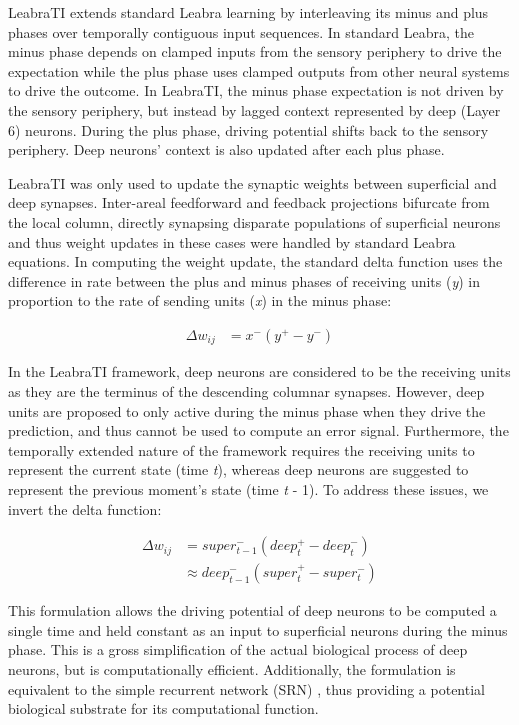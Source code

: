 \documentclass[dwyatte_dissertation.tex]{subfiles}
\begin{document}
LeabraTI extends standard Leabra learning by interleaving its minus and plus phases over temporally contiguous input sequences. In standard Leabra, the minus phase depends on clamped inputs from the sensory periphery to drive the expectation while the plus phase uses clamped outputs from other neural systems to drive the outcome. In LeabraTI, the minus phase expectation is not driven by the sensory periphery, but instead by lagged context represented by deep (Layer 6) neurons. During the plus phase, driving potential shifts back to the sensory periphery. Deep neurons' context is also updated after each plus phase.

LeabraTI was only used to update the synaptic weights between superficial and deep synapses. Inter-areal feedforward and feedback projections bifurcate from the local column, directly synapsing disparate populations of superficial neurons and thus weight updates in these cases were handled by standard Leabra equations. In computing the weight update, the standard delta function uses the difference in rate between the plus and minus phases of receiving units (\textit{y}) in proportion to the rate of sending units (\textit{x}) in the minus phase:

\begin{align*}
\Delta w_{ij} &= x^-(y^+ - y^-)
\end{align*}

In the LeabraTI framework, deep neurons are considered to be the receiving units as they are the terminus of the descending columnar synapses. However, deep units are proposed to only active during the minus phase when they drive the prediction, and thus cannot be used to compute an error signal. Furthermore, the temporally extended nature of the framework requires the receiving units to represent the current state (time \textit{t}), whereas deep neurons are suggested to represent the previous moment's state (time \textit{t} - 1). To address these issues, we invert the delta function:

\begin{align*}
\Delta w_{ij} &= super^-_{t-1}(deep^+_{t} - deep^-_{t}) \\
			  &\approx deep^-_{t-1}(super^+_{t} - super^-_{t})
\end{align*}

This formulation allows the driving potential of deep neurons to be computed a single time and held constant as an input to superficial neurons during the minus phase. This is a gross simplification of the actual biological process of deep neurons, but is computationally efficient. Additionally, the formulation is equivalent to the simple recurrent network (SRN) \cite{Elman90,Servan-SchreiberCleeremansMcClelland91}, thus providing a potential biological substrate for its computational function.
\end{document}
